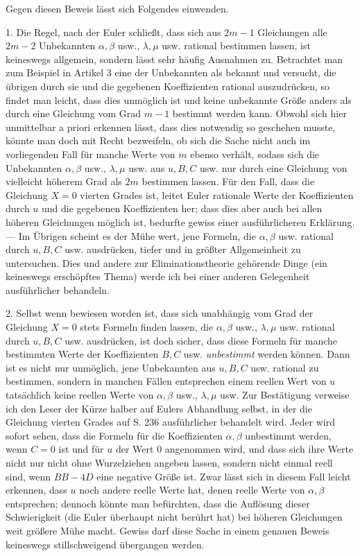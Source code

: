 Gegen diesen Beweis lässt sich Folgendes einwenden.

1. Die Regel, nach der Euler schließt, dass sich aus $2m-1$ Gleichungen alle $2m-2$ Unbekannten $\alpha,\beta$ usw., $\lambda,\mu$ usw. rational bestimmen lassen, ist keineswegs allgemein, sondern lässt sehr häufig Ausnahmen zu. Betrachtet man zum Beispiel in Artikel 3 eine der Unbekannten als bekannt und versucht, die übrigen durch sie und die gegebenen Koeffizienten rational auszudrücken, so findet man leicht, dass dies unmöglich ist und keine unbekannte Größe anders als durch eine Gleichung vom Grad $m-1$ bestimmt werden kann. Obwohl sich hier unmittelbar a priori erkennen lässt, dass dies notwendig so geschehen musste, könnte man doch mit Recht bezweifeln, ob sich die Sache nicht auch im vorliegenden Fall für manche Werte von $m$ ebenso verhält, sodass sich die Unbekannten $\alpha,\beta$ usw., $\lambda,\mu$ usw. aus $u,B,C$ usw. nur durch eine Gleichung von vielleicht höherem Grad als $2m$ bestimmen lassen. Für den Fall, dass die Gleichung $X=0$ vierten Grades ist, leitet Euler rationale Werte der Koeffizienten durch $u$ und die gegebenen Koeffizienten her; dass dies aber auch bei allen höheren Gleichungen möglich ist, bedurfte gewiss einer ausführlicheren Erklärung. --- Im Übrigen scheint es der Mühe wert, jene Formeln, die $\alpha,\beta$ usw. rational durch $u,B,C$ usw. ausdrücken, tiefer und in größter Allgemeinheit zu untersuchen. Dies und andere zur Eliminationstheorie gehörende Dinge (ein keineswegs erschöpftes Thema) werde ich bei einer anderen Gelegenheit ausführlicher behandeln.

2. Selbst wenn bewiesen worden ist, dass sich unabhängig vom Grad der Gleichung $X=0$ stets Formeln finden lassen, die $\alpha,\beta$ usw., $\lambda,\mu$ usw. rational durch $u,B,C$ usw. ausdrücken, ist doch sicher, dass diese Formeln für manche bestimmten Werte der Koeffizienten $B,C$ usw. \textit{unbestimmt} werden können. Dann ist es nicht nur unmöglich, jene Unbekannten aus $u,B,C$ usw. rational zu bestimmen, sondern in manchen Fällen entsprechen einem reellen Wert von $u$ tatsächlich keine reellen Werte von $\alpha,\beta$ usw., $\lambda,\mu$ usw. Zur Bestätigung verweise ich den Leser der Kürze halber auf Eulers Abhandlung selbst, in der die Gleichung vierten Grades auf S. 236 ausführlicher behandelt wird. Jeder wird sofort sehen, dass die Formeln für die Koeffizienten $\alpha,\beta$ unbestimmt werden, wenn $C=0$ ist und für $u$ der Wert $0$ angenommen wird, und dass sich ihre Werte nicht nur nicht ohne Wurzelziehen angeben lassen, sondern nicht einmal reell sind, wenn $BB-4D$ eine negative Größe ist. Zwar lässt sich in diesem Fall leicht erkennen, dass $u$ noch andere reelle Werte hat, denen reelle Werte von $\alpha,\beta$ entsprechen; dennoch könnte man befürchten, dass die Auflösung dieser Schwierigkeit (die Euler überhaupt nicht berührt hat) bei höheren Gleichungen weit größere Mühe macht. Gewiss darf diese Sache in einem genauen Beweis keineswegs stillschweigend übergangen werden.

